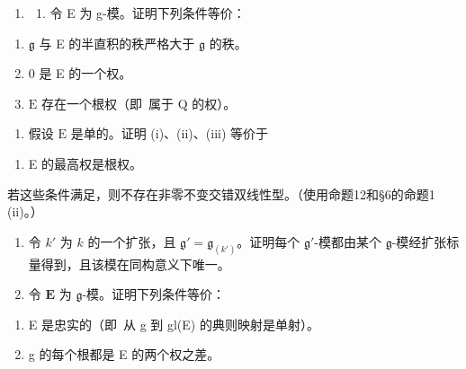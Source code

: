 \begin{enumerate}
\def\labelenumi{\arabic{enumi})}
\setcounter{enumi}{2}
\tightlist
\item
  \begin{enumerate}
  \def\labelenumii{\alph{enumii})}
  \tightlist
  \item
    令 E 为 g-模。证明下列条件等价：
  \end{enumerate}
\end{enumerate}

\begin{enumerate}
\def\labelenumi{(\roman{enumi})}
\item
  \(\mathfrak{g}\) 与 E 的半直积的秩严格大于 \(\mathfrak{g}\) 的秩。
\item
  0 是 E 的一个权。
\item
  \(\mathrm{E}\) 存在一个根权（即~属于 \(\mathrm{Q}\) 的权）。
\end{enumerate}

\begin{enumerate}
\def\labelenumi{\alph{enumi})}
\setcounter{enumi}{1}
\tightlist
\item
  假设 \(\mathrm{E}\) 是单的。证明 (i)、(ii)、(iii) 等价于
\end{enumerate}

\begin{enumerate}
\def\labelenumi{(\roman{enumi})}
\setcounter{enumi}{3}
\tightlist
\item
  E 的最高权是根权。
\end{enumerate}

若这些条件满足，则不存在非零不变交错双线性型。（使用命题12和§6的命题1 (ii)。）

\begin{enumerate}
\def\labelenumi{\arabic{enumi})}
\setcounter{enumi}{3}
\item
  令 \(k'\) 为 \(k\) 的一个扩张，且 \(\mathfrak{g}' = \mathfrak{g}_{(k')}\)。证明每个 \(\mathfrak{g}'\)-模都由某个 \(\mathfrak{g}\)-模经扩张标量得到，且该模在同构意义下唯一。
\item
  令 \(\mathbf{E}\) 为 \(\mathfrak{g}\)-模。证明下列条件等价：
\end{enumerate}

\begin{enumerate}
\def\labelenumi{(\roman{enumi})}
\item
  E 是忠实的（即~从 g 到 gl(E) 的典则映射是单射）。
\item
  g 的每个根都是 E 的两个权之差。
\end{enumerate}

